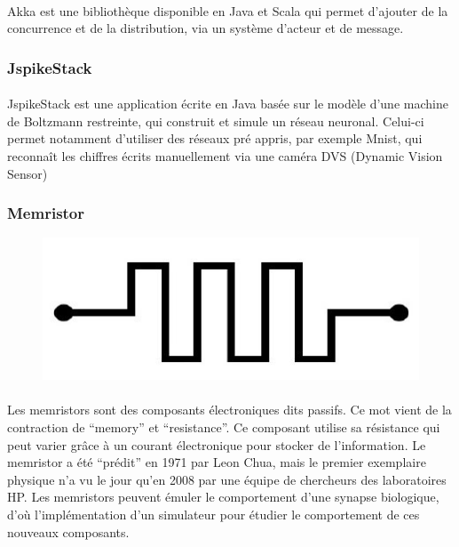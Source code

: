 \documentclass[a4paper,10pt]{article}
\begin{document}
\paragraph{}
Akka est une bibliothèque disponible en Java et Scala qui permet d’ajouter de la concurrence et de la distribution, via un système d'acteur et de message.
        
\subsubsection{JspikeStack} 

\paragraph{}
JspikeStack est une application écrite en Java basée sur le modèle d'une machine de Boltzmann restreinte, qui construit et simule un réseau neuronal. Celui-ci permet notamment d’utiliser des réseaux pré appris, par exemple Mnist, qui reconnaît les chiffres écrits manuellement via une caméra DVS (Dynamic Vision Sensor)

\subsubsection{Memristor} 
\begin{figure}[h!]
\includegraphics[scale=0.12,right]{image/memristor.jpg}
\end{figure}
\paragraph{}
Les memristors sont des composants électroniques dits passifs. Ce mot vient de la contraction de “memory” et “resistance”. Ce composant utilise sa résistance qui peut varier grâce à un courant électronique pour stocker de l’information. Le memristor a été “prédit” en 1971 par Leon Chua, mais le premier exemplaire physique n’a vu le jour qu’en 2008 par une équipe de chercheurs des laboratoires HP. Les memristors peuvent émuler le comportement d'une synapse biologique, d’où l’implémentation d’un simulateur pour étudier le comportement de ces nouveaux composants.
\end{document}
